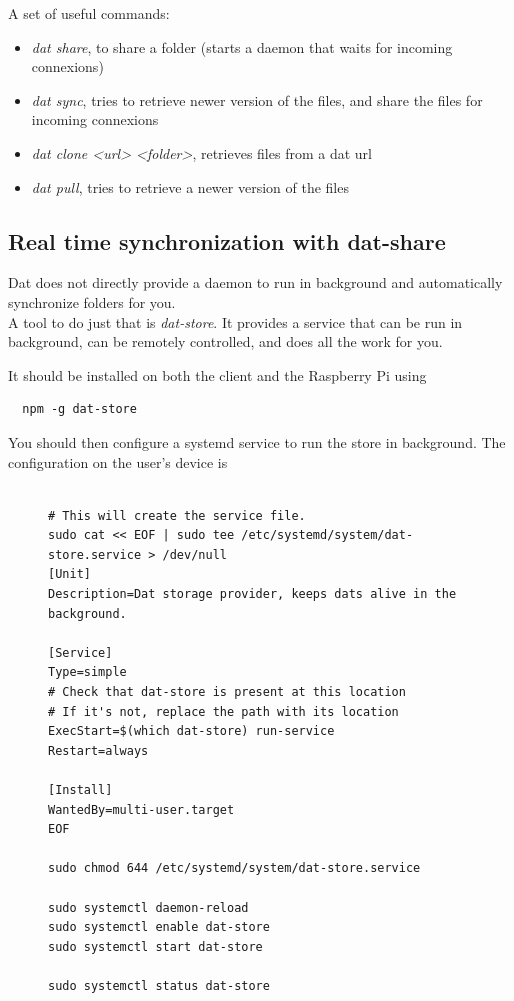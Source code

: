 \documentclass[a4paper,11pt,oneside]{report}
\begin{document}
A set of useful commands:
\begin{itemize}
  \item \emph{dat share}, to share a folder (starts a daemon that waits for incoming connexions)
  \item \emph{dat sync}, tries to retrieve newer version of the files, and share the files for incoming connexions
  \item \emph{dat clone <url> <folder>}, retrieves files from a dat url
  \item \emph{dat pull}, tries to retrieve a newer version of the files
\end{itemize}

\subsection{Real time synchronization with dat-share}

Dat does not directly provide a daemon to run in background and automatically synchronize folders for you. \\

A tool to do just that is \emph{dat-store}. It provides a service that can be run in background, can be remotely controlled, and does all the work for you.

It should be installed on both the client and the Raspberry Pi using 
\begin{lstlisting}
  npm -g dat-store
\end{lstlisting}

You should then configure a systemd service to run the store in background. The configuration on the user's device is 
\begin{figure}
  \begin{lstlisting}[label=cmd:dat_store_systemd_user, caption=Configure dat-store systemd service on the user device]
    
# This will create the service file.
sudo cat << EOF | sudo tee /etc/systemd/system/dat-store.service > /dev/null
[Unit]
Description=Dat storage provider, keeps dats alive in the background.

[Service]
Type=simple
# Check that dat-store is present at this location
# If it's not, replace the path with its location
ExecStart=$(which dat-store) run-service
Restart=always

[Install]
WantedBy=multi-user.target
EOF

sudo chmod 644 /etc/systemd/system/dat-store.service

sudo systemctl daemon-reload
sudo systemctl enable dat-store
sudo systemctl start dat-store

sudo systemctl status dat-store
  \end{lstlisting}
\end{figure}
\end{document}
